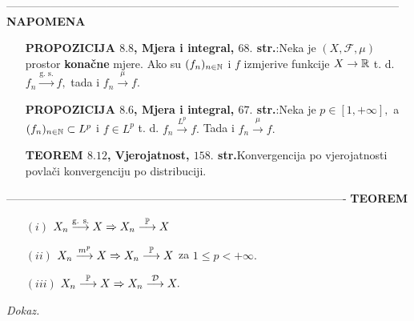 \documentclass{article}
\begin{document}
---------------------------------------------------------------------------------------------------------\newline\newline{}\textbf{NAPOMENA}
\begin{itemize}
    \item[\ding{96}] \textbf{PROPOZICIJA \(8.8\), Mjera i integral, \(68.\) str.}:\newline Neka je \(\left(X,\mathcal F,\mu\right)\) prostor \textbf{konačne} mjere. Ako su \((f_n)_{n\in\Bbb N}\) i \(f\) izmjerive funkcije \(X\to\Bbb R\) t. d. \(f_n\overset{\text{g. s.}}{\longrightarrow}f,\) tada i \(f_n\overset{\mu}{\longrightarrow}f.\)
    \item[\ding{96}] \textbf{PROPOZICIJA \(8.6\), Mjera i integral, \(67.\) str.}:\newline Neka je \(p\in[1,+\infty],\) a \((f_n)_{n\in\Bbb N}\subset L^p\) i \(f\in L^p\) t. d. \(f_n\overset{L^p}{\longrightarrow}f.\) Tada i \(f_n\overset{\mu}{\longrightarrow}f.\)
    \item[\ding{96}] \textbf{TEOREM \(8.12\), Vjerojatnost, \(158.\) str.}\newline Konvergencija po vjerojatnosti povlači konvergenciju po distribuciji.
\end{itemize}-------------------------------------------------------------------------------------------\newline\newline
\textbf{TEOREM}
\begin{itemize}
    \item[\((i)\)] \(X_n\overset{\text{g. s.}}{\longrightarrow}X\Rightarrow X_n\overset{\Bbb P}{\longrightarrow}X\)
    \item[\((ii)\)] \(X_n\overset{m^p}{\longrightarrow}X\Rightarrow X_n\overset{\Bbb P}{\longrightarrow}X\) za \(1\le p<+\infty.\)
    \item[\((iii)\)] \(X_n\overset{\Bbb P}{\longrightarrow}X\Rightarrow X_n\overset{\mathcal D}{\longrightarrow}X.\)
\end{itemize}
\textit{Dokaz.}
\end{document}
